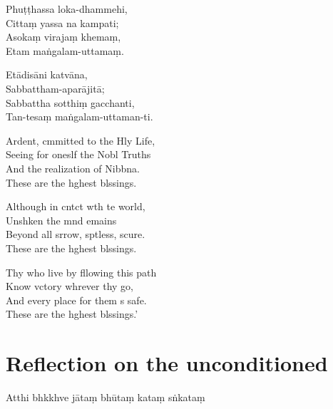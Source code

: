Phuṭṭhassa loka-dhammehi,\\
Cittaṃ yassa na kampati;\\
Asokaṃ virajaṃ khemaṃ,\\
Etam maṅgalam-uttamaṃ.

Etādisāni katvāna,\\
Sabbattham-aparājitā;\\
Sabbattha sotthiṃ gacchanti,\\
Tan-tesaṃ maṅgalam-uttaman-ti.




\clearpage

Ardent, cmmitted to the Hly Life,\\%
Seeing for oneslf the Nobl Truths\\
And the realization of Nibbna.\\
These are the hghest blssings.

Although in cntct wth te world,\\
Unshken the mnd emains\\
Beyond all srrow, sptless, scure.\\
These are the hghest blssings.

Thy who live by fllowing this path\\
Know vctory whrever thy go,\\
And every place for them s safe.\\
These are the hghest blssings.'



\clearpage

\chapter[The unconditioned]{Reflection on the unconditioned}%

\begin{leader}
\end{leader}

Atthi bhkkhve jātaṃ bhūtaṃ kataṃ sṅkataṃ

